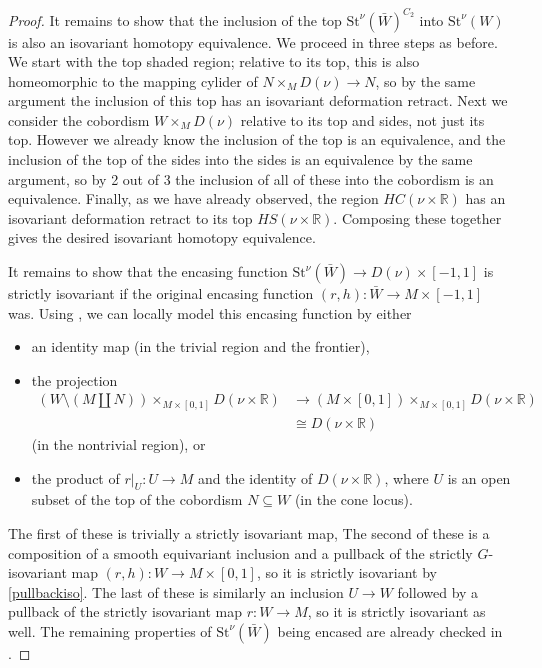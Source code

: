 \documentclass[11pt]{amsart}
\theoremstyle{definition}
\numberwithin{equation}{section}
\numberwithin{figure}{section}
\newcommand{\R}{\mathbb R}
\newcommand{\St}{\mathrm{St}}
\begin{document}
\begin{proof}
It remains to show that the inclusion of the top $\St^\nu(\bar W)^{C_2}$ into $\St^\nu(W)$ is also an isovariant homotopy equivalence. We proceed in three steps as before. We start with the top shaded region; relative to its top, this is also homeomorphic to the mapping cylider of $N \times_M D(\nu) \to N$, so by the same argument the inclusion of this top has an isovariant deformation retract. Next we consider the cobordism $W \times_M D(\nu)$ relative to its top and sides, not just its top. However we already know the inclusion of the top is an equivalence, and the inclusion of the top of the sides into the sides is an equivalence by the same argument, so by 2 out of 3 the inclusion of all of these into the cobordism is an equivalence. Finally, as we have already observed, the region $HC(\nu \times \R)$ has an isovariant deformation retract to its top $HS(\nu \times \R)$. Composing these together gives the desired isovariant homotopy equivalence.

It remains to show that the encasing function $\St^\nu(\bar W) \to D(\nu) \times [-1,1]$ is strictly isovariant if the original encasing function $(r,h)\colon \bar W \to M \times [-1,1]$ was. Using \cite[Lemma 5.15]{GIMM1}, we can locally model this encasing function by either
\begin{itemize}
	\item an identity map (in the trivial region and the frontier),
	\item the projection
	\begin{align*}
		(W \setminus (M \amalg N)) \times_{M \times [0,1]} D(\nu \times \R) &\to (M \times [0,1]) \times_{M \times [0,1]} D(\nu \times \R) \\
		&\cong D(\nu \times \R)
	\end{align*}
	 (in the nontrivial region), or
	\item the product of $r|_U\colon U \to M$ and the identity of $D(\nu \times \R)$, where $U$ is an open subset of the top of the cobordism $N \subseteq W$ (in the cone locus).
\end{itemize}
The first of these is trivially a strictly isovariant map, The second of these is a composition of a smooth equivariant inclusion and a pullback of the strictly $G$-isovariant map $(r,h)\colon W \to M \times [0,1]$, so it is strictly isovariant by \autoref{pullbackiso}. The last of these is similarly an inclusion $U \to W$ followed by a pullback of the strictly isovariant map $r\colon W \to M$, so it is strictly isovariant as well. The remaining properties of $\St^\nu(\bar W)$ being encased are already checked in \cite[Lemma 5.18]{GIMM1}.
\end{proof}
\end{document}
